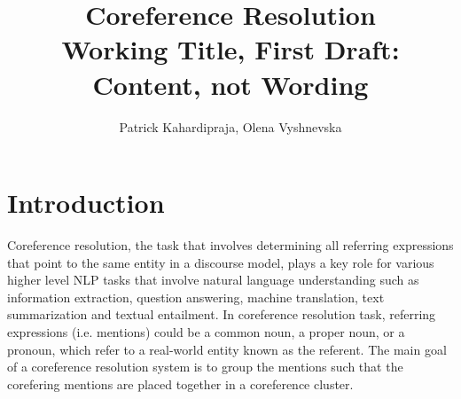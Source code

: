 \documentclass[11pt]{article}
\title{{\LARGE Coreference Resolution}\\[1.5mm]
{\large Working Title, First Draft: Content, not Wording}\\[1.5mm]} %
\author{Patrick Kahardipraja, Olena Vyshnevska}%
\date{} %
\begin{document}
\maketitle


\section{Introduction}










Coreference resolution, the task that involves determining all referring expressions that point to the same entity in a discourse model, plays a key role for various higher level NLP tasks that involve natural language understanding such as information extraction, question answering, machine translation, text summarization and textual entailment. In coreference resolution task, referring expressions (i.e. mentions) could be a common noun, a proper noun, or a pronoun, which refer to a real-world entity known as the referent. The main goal of a coreference resolution system is to group the mentions such that the corefering mentions are placed together in a coreference cluster.
\end{document}
